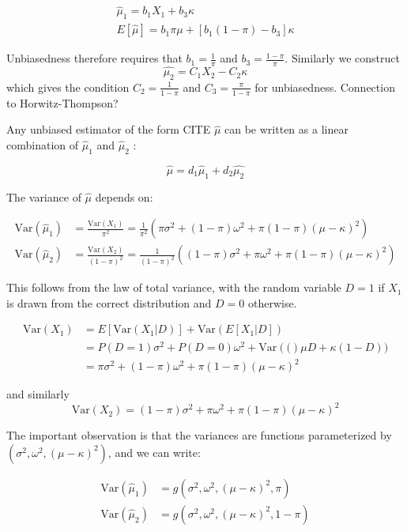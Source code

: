 \documentclass[11pt]{amsart}
\newcommand{\Var}[1]{\text{Var}\left(#1\right)}
\begin{document}
\begin{gather*} 
\hat{\mu}_1 = b_1 X_{1} + b_3 \kappa \\
E[\hat{\mu}] = b_1 \pi \mu + [b_1(1-\pi) - b_3] \kappa
\end{gather*}

Unbiasedness therefore requires that $b_1 = \frac{1}{\pi}$ and $b_3 = \frac{1-\pi}{\pi}$.  Similarly we construct
$$\hat{\mu_2} = C_1 X_2 - C_2 \kappa $$ 
which gives the condition $C_2 = \frac{1}{1-\pi}$ and $C_3 = \frac{\pi}{1-\pi}$ for unbiasedness.  Connection to Horwitz-Thompson?

Any unbiased estimator of the form CITE $\hat{\mu}$ can be written as a linear combination of $\hat{\mu}_1$ and $\hat{\mu}_2$ :

$$\hat{\mu} = d_1 \hat{\mu}_1 + d_2 \hat{\mu_2}$$

The variance of $\hat{\mu}$ depends on:

\begin{align*} \Var{\hat{\mu}_1} &=  \frac{\text{Var}(X_1)}{\pi^2} = \frac{1}{\pi^2}\left(\pi \sigma^2 + (1-\pi) \omega^2 + \pi(1-\pi)(\mu-\kappa)^2\right) \\
\Var{\hat{\mu}_2} &= \frac{\Var{X_2}}{(1-\pi)^2} = \frac{1}{(1-\pi)^2}\left((1-\pi)\sigma^2 + \pi \omega^2 + \pi(1-\pi)(\mu-\kappa)^2\right) 
\end{align*}

This follows from the law of total variance, with the random variable $D = 1$ if $X_1$ is drawn from the correct distribution and $D=0$ otherwise. 

\begin{align*} \Var{X_1} &= E[\Var{X_1 | D}] + \Var{E[X_1| D]} \\ 
&= P(D=1)\sigma^2 +  P(D=0)\omega^2 + \Var(\mu D + \kappa (1-D)) \\
&= \pi \sigma^2 + (1-\pi) \omega^2 + \pi(1-\pi)(\mu-\kappa)^2
\end{align*}

and similarly 
$$\Var{X_2} = (1-\pi)\sigma^2 + \pi \omega^2 + \pi(1-\pi)(\mu-\kappa)^2 $$ 

The important observation is that the variances are functions parameterized by $(\sigma^2, \omega^2, (\mu-\kappa)^2)$, and we can write: 

\begin{align*} \Var{\hat{\mu}_1} &= g(\sigma^2, \omega^2, (\mu-\kappa)^2, \pi) \\
\Var{\hat{\mu}_2} &= g(\sigma^2, \omega^2, (\mu-\kappa)^2, 1-\pi)
\end{align*}
\end{document}
